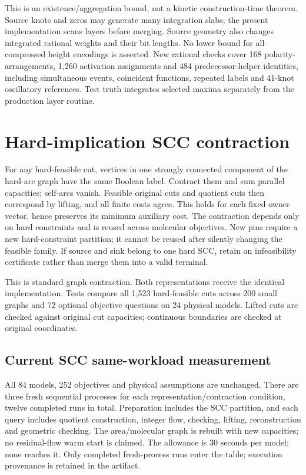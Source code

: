 \documentclass[10pt,letterpaper]{article}
\begin{document}
This is an existence/aggregation bound, not a kinetic construction-time theorem. Source knots and zeros may generate many integration slabs; the present implementation scans layers before merging. Source geometry also changes integrated rational weights and their bit lengths. No lower bound for all compressed height encodings is asserted. New rational checks cover 168 polarity-arrangements, 1,260 activation assignments and 484 predecessor-helper identities, including simultaneous events, coincident functions, repeated labels and 41-knot oscillatory references. Test truth integrates selected maxima separately from the production layer routine.

\section{Hard-implication SCC contraction}
For any hard-feasible cut, vertices in one strongly connected component of the hard-arc graph have the same Boolean label. Contract them and sum parallel capacities; self-arcs vanish. Feasible original cuts and quotient cuts then correspond by lifting, and all finite costs agree. This holds for each fixed owner vector, hence preserves its minimum auxiliary cost. The contraction depends only on hard constraints and is reused across molecular objectives. New pins require a new hard-constraint partition; it cannot be reused after silently changing the feasible family. If source and sink belong to one hard SCC, retain an infeasibility certificate rather than merge them into a valid terminal.

This is standard graph contraction. Both representations receive the identical implementation. Tests compare all 1,523 hard-feasible cuts across 200 small graphs and 72 optional objective questions on 24 physical models. Lifted cuts are checked against original cut capacities; continuous boundaries are checked at original coordinates.

\subsection{Current SCC same-workload measurement}\label{sec:current_scc}
All 84 models, 252 objectives and physical assumptions are unchanged. There are three fresh sequential processes for each representation/contraction condition, twelve completed runs in total. Preparation includes the SCC partition, and each query includes quotient construction, integer flow, checking, lifting, reconstruction and geometric checking. The area/molecular graph is rebuilt with new capacities; no residual-flow warm start is claimed. The allowance is 30 seconds per model; none reaches it. Only completed fresh-process runs enter the table; execution provenance is retained in the artifact.
\end{document}
